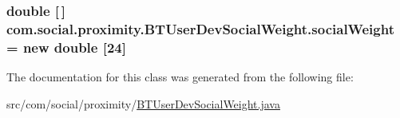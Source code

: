\subsubsection[{social\+Weight}]{\setlength{\rightskip}{0pt plus 5cm}double \mbox{[}$\,$\mbox{]} com.\+social.\+proximity.\+B\+T\+User\+Dev\+Social\+Weight.\+social\+Weight = new double \mbox{[}24\mbox{]}\hspace{0.3cm}{\ttfamily [private]}}\label{classcom_1_1social_1_1proximity_1_1_b_t_user_dev_social_weight_a9acca1b321aa087c5529f7d7e1e62419}


The documentation for this class was generated from the following file\+:\begin{DoxyCompactItemize}
\item 
src/com/social/proximity/\hyperlink{_b_t_user_dev_social_weight_8java}{B\+T\+User\+Dev\+Social\+Weight.\+java}\end{DoxyCompactItemize}
